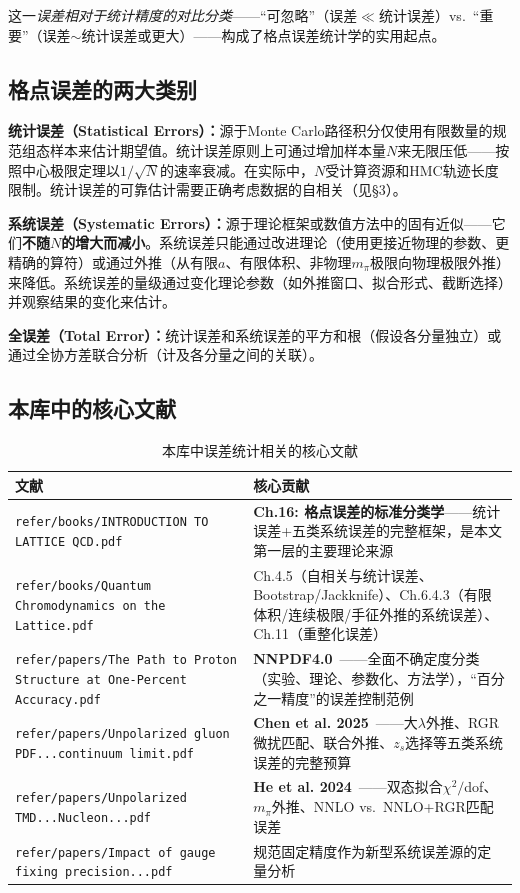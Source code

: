 \documentclass[12pt,a4paper]{ctexart}
\begin{document}
这一\emph{误差相对于统计精度的对比分类}——``可忽略''（误差$\ll$统计误差）vs.\ ``重要''（误差$\sim$统计误差或更大）——构成了格点误差统计学的实用起点。

\subsection{格点误差的两大类别}

\textbf{统计误差（Statistical Errors）：}源于Monte Carlo路径积分仅使用有限数量的规范组态样本来估计期望值。统计误差原则上可通过增加样本量$N$来无限压低——按照中心极限定理以$1/\sqrt{N}$的速率衰减。在实际中，$N$受计算资源和HMC轨迹长度限制。统计误差的可靠估计需要正确考虑数据的自相关（见§3）。

\textbf{系统误差（Systematic Errors）：}源于理论框架或数值方法中的固有近似——它们\textbf{不随$N$的增大而减小}。系统误差只能通过改进理论（使用更接近物理的参数、更精确的算符）或通过外推（从有限$a$、有限体积、非物理$m_\pi$极限向物理极限外推）来降低。系统误差的量级通过变化理论参数（如外推窗口、拟合形式、截断选择）并观察结果的变化来估计。

\textbf{全误差（Total Error）：}统计误差和系统误差的平方和根（假设各分量独立）或通过全协方差联合分析（计及各分量之间的关联）。

\subsection{本库中的核心文献}

\begin{table}[H]
\centering
\caption{本库中误差统计相关的核心文献}
\label{tab:err_papers}
\small
\begin{tabular}{lp{9cm}}
\toprule
\textbf{文献} & \textbf{核心贡献} \\
\midrule
\texttt{refer/books/INTRODUCTION TO LATTICE QCD.pdf}~\cite{Gupta1997intro} &
\textbf{Ch.16: 格点误差的标准分类学}——统计误差+五类系统误差的完整框架，是本文第一层的主要理论来源 \\
\texttt{refer/books/Quantum Chromodynamics on the Lattice.pdf}~\cite{GattringerLang2010} &
Ch.4.5（自相关与统计误差、Bootstrap/Jackknife）、Ch.6.4.3（有限体积/连续极限/手征外推的系统误差）、Ch.11（重整化误差） \\
\texttt{refer/papers/The Path to Proton Structure at One-Percent Accuracy.pdf} &
\textbf{NNPDF4.0}~\cite{NNPDF2021}——全面不确定度分类（实验、理论、参数化、方法学），``百分之一精度''的误差控制范例 \\
\texttt{refer/papers/Unpolarized gluon PDF...continuum limit.pdf} &
\textbf{Chen et al. 2025}~\cite{Chen2025gluon}——大$\lambda$外推、RGR微扰匹配、联合外推、$z_s$选择等五类系统误差的完整预算 \\
\texttt{refer/papers/Unpolarized TMD...Nucleon...pdf} &
\textbf{He et al. 2024}~\cite{He2024unpolTMD}——双态拟合$\chi^2/$dof、$m_\pi$外推、NNLO vs.\ NNLO+RGR匹配误差 \\
\texttt{refer/papers/Impact of gauge fixing precision...pdf} &
规范固定精度作为新型系统误差源的定量分析~\cite{Zhang2024gauge_fixing} \\
\bottomrule
\end{tabular}
\end{table}
\end{document}
